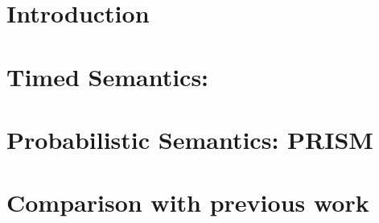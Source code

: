 
\chapter{Introduction}\label{cha:semantics-intro}


\chapter{Timed Semantics: \tockcsp}\label{cha:semantics-tockcsp}


\chapter{Probabilistic Semantics: PRISM}\label{cha:semantics-prism}
%

\chapter{Comparison with previous work}\label{cha:semantics-comparison}


